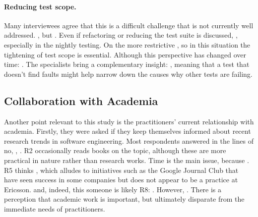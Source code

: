 \paragraph{Reducing test scope.} Many interviewees agree that this is a difficult challenge that is not currently well addressed.
, but .
Even if refactoring or reducing the test suite is discussed, , especially in the nightly testing.
On the more restrictive , so in this situation the tightening of test scope is essential.
Although this perspective has changed over time: .
The specialists bring a complementary insight: , meaning that a test that doesn't find faults might help narrow down the causes why other tests are failing.

\subsection{Collaboration with Academia}

Another point relevant to this study is the practitioners' current relationship with academia.
Firstly, they were asked if they keep themselves informed about recent research trends in software engineering.
Most respondents answered in the lines of no, , . 
R2 occasionally reads books on the topic, although these are more practical in nature rather than research works.
Time is the main issue, because .
R5 thinks , which alludes to initiatives such as the Google Journal Club \cite{googlejournal} that have seen success in some companies but does not appear to be a practice at Ericsson.
 and, indeed, this someone is likely R8: .
However, .
There is a perception that academic work is important, but ultimately disparate from the immediate needs of practitioners.

